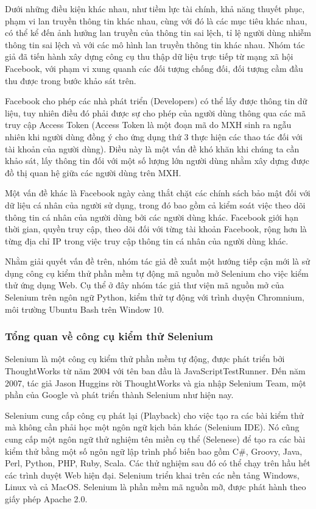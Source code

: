Dưới những điều kiện khác nhau, như tiềm lực tài chính, khả năng thuyết phục, phạm vi lan truyền thông tin khác nhau, cùng với đó là các mục tiêu khác nhau, có thể kể đến ảnh hưởng lan truyền của thông tin sai lệch, tỉ lệ người dùng nhiễm thông tin sai lệch và với các mô hình lan truyền thông tin khác nhau. Nhóm tác giả đã tiến hành xây dựng công cụ thu thập dữ liệu trực tiếp từ mạng xã hội Facebook, với phạm vi xung quanh các đối tượng chống đối, đối tượng cầm đầu thu được trong bước khảo sát trên.

Facebook cho phép các nhà phát triển (Developers) có thể lấy được thông tin dữ liệu, tuy nhiên điều đó phải được sự cho phép của người dùng thông qua các mã truy cập Access Token (Access Token là một đoạn mã do MXH sinh ra ngẫu nhiên khi người dùng đồng ý cho ứng dụng thứ 3 thực hiện các thao tác đối với tài khoản của người dùng). Điều này là một vấn đề khó khăn khi chúng ta cần khảo sát, lấy thông tin đối với một số lượng lớn người dùng nhằm xây dựng được đồ thị quan hệ giữa các người dùng trên MXH.

Một vấn đề khác là Facebook ngày càng thắt chặt các chính sách bảo mật đối với dữ liệu cá nhân của người sử dụng, trong đó bao gồm cả kiểm soát việc theo dõi thông tin cá nhân của người dùng bởi các người dùng khác. Facebook giới hạn thời gian, quyền truy cập, theo dõi đối với từng tài khoản Facebook, rộng hơn là từng địa chỉ IP trong việc truy cập thông tin cá nhân của người dùng khác.

Nhằm giải quyết vấn đề trên, nhóm tác giả đề xuất một hướng tiếp cận mới là sử dụng công cụ kiểm thử phần mềm tự động mã nguồn mở Selenium cho việc kiểm thử ứng dụng Web. Cụ thể ở đây nhóm tác giả thư viện mã nguồn mở của Selenium trên ngôn ngữ Python, kiểm thử tự động với trình duyện Chromnium, môi trường Ubuntu Bash trên Window 10.

	\subsubsection{Tổng quan về công cụ kiểm thử Selenium}
Selenium là một công cụ kiểm thử phần mềm tự động, được phát triển bởi ThoughtWorks từ năm 2004 với tên ban đầu là JavaScriptTestRunner. Đến năm 2007, tác giả Jason Huggins rời ThoughtWorks và gia nhập Selenium Team, một phần của Google và phát triển thành Selenium như hiện nay.

Selenium cung cấp công cụ phát lại (Playback) cho việc tạo ra các bài kiểm thử mà không cần phải học một ngôn ngữ kịch bản khác (Selenium IDE). Nó cũng cung cấp một ngôn ngữ thử nghiệm tên miền cụ thể (Selenese) để tạo ra các bài kiểm thử bằng một số ngôn ngữ lập trình phổ biến bao gồm C\#, Groovy, Java, Perl, Python, PHP, Ruby, Scala. Các thử nghiệm sau đó có thể chạy trên hầu hết các trình duyệt Web hiện đại. Selenium triển khai trên các nền tảng Windows, Linux và cả MacOS. Selenium là phần mềm mã nguồn mỡ, được phát hành theo giấy phép Apache 2.0.


